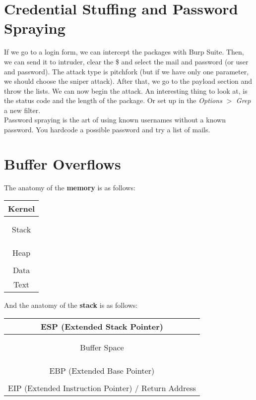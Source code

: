 \documentclass[11pt,a4paper]{article}
\begin{document}
\section{Credential Stuffing and Password Spraying}
If we go to a login form, we can intercept the packages with Burp Suite. Then, we can send it to intruder, clear the \$ and select the mail and password (or user and password). The attack type is pitchfork (but if we have only one parameter, we should choose the sniper attack). After that, we go to the payload section and throw the lists. We can now begin the attack. An interesting thing to look at, is the status code and the length of the package. Or set up in the \textit{Options} $>$ \textit{Grep} a new filter.\\

\noindent Password spraying is the art of using known usernames without a known password. You hardcode a possible password and try a list of mails.

\section{Buffer Overflows}
The anatomy of the \textbf{memory} is as follows:
\begin{table}[h]
\centering
\begin{tabular}{|c|}
\hline
\hspace{4,5cm} Kernel \hspace*{4,5cm}\\
\hline \\ \\ 
Stack \\ \\ \\
\hline \\
Heap \\ \\
\hline
Data\\
\hline
Text\\
\hline
\end{tabular}
\end{table}

\noindent And the anatomy of the \textbf{stack} is as follows:
\begin{table}[h]
\centering
\begin{tabular}{|c|}
\hline
ESP (Extended Stack Pointer)\\
\hline \\ \\ 
Buffer Space \\ \\ \\
\hline \\
EBP (Extended Base Pointer) \\ \\
\hline
\hspace{,5cm} EIP (Extended Instruction Pointer) / Return Address \hspace*{,5cm}\\
\hline
\end{tabular}
\end{table}
\end{document}
